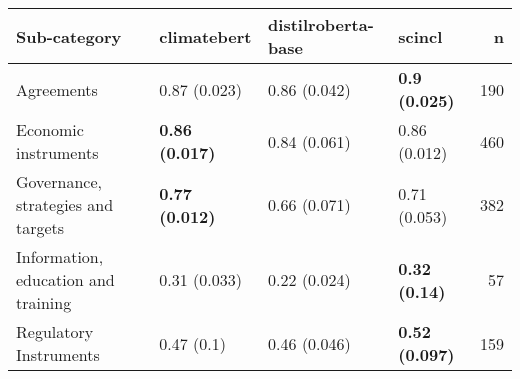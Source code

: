 \begin{tabular}{llllr}
\toprule
Sub-category & climatebert & distilroberta-base & scincl & n \\
\midrule
Agreements & 0.87 (0.023) & 0.86 (0.042) & \textbf{0.9 (0.025)} & 190 \\
Economic instruments & \textbf{0.86 (0.017)} & 0.84 (0.061) & 0.86 (0.012) & 460 \\
Governance, strategies and targets & \textbf{0.77 (0.012)} & 0.66 (0.071) & 0.71 (0.053) & 382 \\
Information, education and training & 0.31 (0.033) & 0.22 (0.024) & \textbf{0.32 (0.14)} & 57 \\
Regulatory Instruments & 0.47 (0.1) & 0.46 (0.046) & \textbf{0.52 (0.097)} & 159 \\
\bottomrule
\end{tabular}
